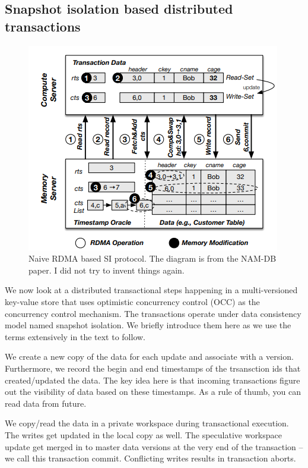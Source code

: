 \subsection{Snapshot isolation based distributed transactions}

\begin{figure}[]   
	\centering
	\includegraphics[width=\linewidth]{figures/SI.png} 
	\caption{\small Naive RDMA based SI protocol. The diagram is from the NAM-DB paper. I did not try to invent things again.} 
	\label{fig:si} 
\end{figure}

We now look at a distributed transactional steps happening in a 
multi-versioned key-value store that uses optimistic concurrency control (OCC)
as the concurrency control mechanism. The transactions operate under data consistency
model named snapshot isolation. We briefly introduce them here as we use the terms 
extensively in the text to follow.

We create a new copy of the data for each update and associate with a version. Furthermore, we record the 
begin and end timestamps of the trsansction ids that created/updated the data. The key idea here is that
incoming transactions figure out the visibility of data based on these timestamps. As a rule of thumb, you
can read data from future.

We copy/read the data in a private workspace during transactional execution. The writes get updated in the 
local copy as well. The speculative workspace update get merged in to master data versions at the very
end of the transaction -- we call this transaction commit. Conflicting writes results in transaction aborts.

